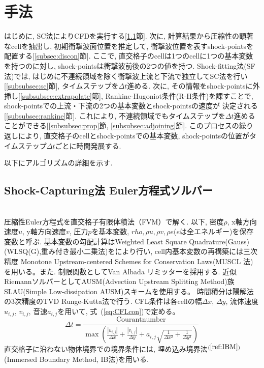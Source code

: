 \documentclass[a4j]{jarticle}
\begin{document}
\section{手法} \label{sec:method}

はじめに, SC法によりCFDを実行する[\ref{subsec:sc}節]. 
次に, 計算結果から圧縮性の顕著なcellを抽出し, 初期衝撃波面位置を推定して, 
衝撃波位置を表すshock-pointsを配置する[\ref{subsec:discon}節].
ここで, 直交格子のcellは1つのcellに1つの基本変数を持つのに対し, shock-pointsは衝撃波前後の2つの値を持つ.
Shock-fitting法(SF法)では, はじめに不連続領域を除く衝撃波上流と下流で独立してSC法を行い[\ref{subsubsec:sc}節], タイムステップを$\Delta t$進める.
次に, その情報をshock-pointsに外挿し[\ref{subsubsec:extrapolate}節], Rankine-Hugoniot条件(R-H条件)を課すことで, shock-pointsでの上流・下流の2つの基本変数とshock-pointsの速度が
決定される[\ref{subsubsec:rankine}節]. これにより, 不連続領域でもタイムステップを$\Delta t$進めることができる[\ref{subsubsec:prop}節, \ref{subsubsec:adjoining}節]. 
このプロセスの繰り返しにより, 直交格子のcellとshock-pointsでの基本変数, shock-pointsの位置がタイムステップ$\Delta t$ごとに時間発展する. 

以下にアルゴリズムの詳細を示す.

\subsection{Shock-Capturing法 Euler方程式ソルバー} \label{subsec:sc}
\mbox{}\\[-3.0ex]

圧縮性Euler方程式を直交格子有限体積法（FVM）で解く.
以下, 密度$\rho$, x軸方向速度$u$, y軸方向速度$v$, 圧力$p$を基本変数,
$rho, \rho u, \rho v, \rho e$($e$は全エネルギー)を保存変数と呼ぶ.
基本変数の勾配計算はWeighted Least Square Quadrature(Gauss)(WLSQ(G),重み付き最小二乗法)をにより行い, cell内基本変数の再構築には三次精度 Monotone Upstream-centered
Schemes for Conservation Laws(MUSCL 法)を用いる。また. 制限関数としてVan Albada リミッターを採用する.
近似RiemannソルバーとしてAUSM(Advection Upstream Splitting Method)族SLAU(Simple Low-dissipation AUSM)スキームを使用する。
時間積分は陽解法の3次精度のTVD Runge-Kutta法で行う.
CFL条件は各cellの幅$\Delta x$, $\Delta y$, 流体速度$u_{i,j}$, $v_{i,j}$, 音速$a_{i, j}$を用いて, 式~(\ref{eq:CFLcon})で定める。
\begin{equation}
    \Delta t =
    \frac{\mathrm{Courant number}}{
        \max\left(
            \frac{|u_{i,j}|}{\Delta x}
            + \frac{|v_{i,j}|}{\Delta y}
            + a_{i,j}
              \sqrt{
                \frac{1}{\Delta x^2}
                + \frac{1}{\Delta y^2}
              }
        \right)
    }
    \label{eq:CFLcon}
\end{equation}
直交格子に沿わない物体境界での境界条件には, 埋め込み境界法$^{(\ref{ref:IBM})}$(Immersed Boundary Method, IB法)を用いる.
\end{document}
